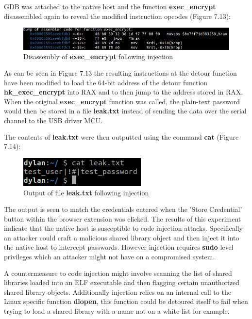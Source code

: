 GDB was attached to the native host and the function \textbf{exec\_encrypt} disassembled again to reveal the modified instruction opcodes (Figure 7.13):

\begin{figure}[H]
\centering
\includegraphics[width=1\columnwidth]{Figures/Fig_41.png}
\caption{Disassembly of \textbf{exec\_encrypt} following injection}
\label{fig:gantt}
\end{figure}

As can be seen in Figure 7.13 the resulting instructions at the detour function have been modified to load the 64-bit address of the detour function \textbf{hk\_exec\_encrypt} into RAX and to then jump to the address stored in RAX. When the original \textbf{exec\_encrypt} function was called, the plain-text password would then be stored in a file \textbf{leak.txt} instead of sending the data over the serial channel to the USB driver MCU.

The contents of \textbf{leak.txt} were then outputted using the command \textbf{cat} (Figure 7.14):

\begin{figure}[H]
\centering
\includegraphics[width=0.45\columnwidth]{Figures/Fig_85.png}
\caption{Output of file \textbf{leak.txt} following injection}
\label{fig:gantt}
\end{figure}

The output is seen to match the credentials entered when the 'Store Credential' button within the browser extension was clicked. The results of this experiment indicate that the native host is susceptible to code injection attacks. Specifically an attacker could craft a malicious shared library object and then inject it into the native host to intercept passwords. However injection requires \textbf{sudo} level privileges which an attacker might not have on a compromised system. 

A countermeasure to code injection might involve scanning the list of shared libraries loaded into an ELF executable and then flagging certain unauthorized shared library objects. Additionally injection relies on an internal call to the Linux specific function \textbf{dlopen}, this function could be detoured itself to fail when trying to load a shared library with a name not on a white-list for example.

